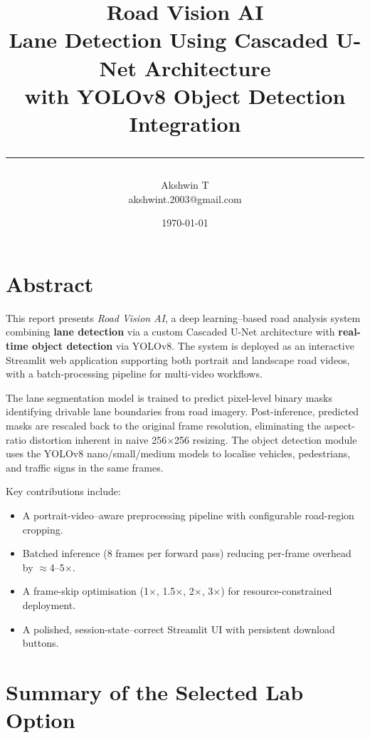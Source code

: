 \documentclass[12pt, a4paper]{article}
\title{
  \vspace{-1cm}
  {\Large\textbf{Road Vision AI}} \\[0.4em]
  {\large Lane Detection Using Cascaded U-Net Architecture \\
   with YOLOv8 Object Detection Integration} \\[0.8em]
  \rule{\textwidth}{0.4pt}
}
\author{Akshwin T \\ \small akshwint.2003@gmail.com}
\date{\today}
\begin{document}

\maketitle
\thispagestyle{empty}
\tableofcontents
\newpage

\section{Abstract}

This report presents \textit{Road Vision AI}, a deep learning--based road
analysis system combining \textbf{lane detection} via a custom Cascaded
U-Net architecture with \textbf{real-time object detection} via YOLOv8.
The system is deployed as an interactive Streamlit web application supporting
both portrait and landscape road videos, with a batch-processing pipeline
for multi-video workflows.

The lane segmentation model is trained to predict pixel-level binary masks
identifying drivable lane boundaries from road imagery. Post-inference,
predicted masks are rescaled back to the original frame resolution,
eliminating the aspect-ratio distortion inherent in naive 256$\times$256
resizing. The object detection module uses the YOLOv8 nano/small/medium
models to localise vehicles, pedestrians, and traffic signs in the same
frames.

Key contributions include:
\begin{itemize}[noitemsep]
  \item A portrait-video--aware preprocessing pipeline with configurable
        road-region cropping.
  \item Batched inference (8 frames per forward pass) reducing per-frame
        overhead by $\approx$4--5$\times$.
  \item A frame-skip optimisation (1$\times$, 1.5$\times$, 2$\times$,
        3$\times$) for resource-constrained deployment.
  \item A polished, session-state--correct Streamlit UI with persistent
        download buttons.
\end{itemize}

\section{Summary of the Selected Lab Option}
\end{document}
